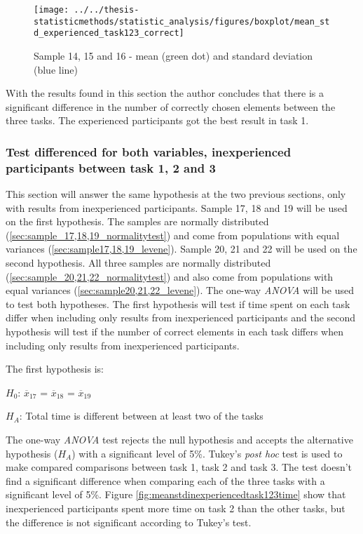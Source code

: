 \begin{figure}[H]
	\centering
	\texttt{[image: ../../thesis-statisticmethods/statistic\_analysis/figures/boxplot/mean\_std\_experienced\_task123\_correct]}
	\caption{Sample 14, 15 and 16 - mean (green dot) and standard deviation (blue line)}
	\label{fig:meanstdexperiencedtask123correct}
\end{figure}

\vspace{0.3cm}

With the results found in this section the author concludes that there is a significant difference in the number of correctly chosen elements between the three tasks. The experienced participants got the best result in task 1. 

\subsubsection[Sample 17, 18 and 19, 20, 21 and 22]{Test differenced for both variables, inexperienced participants between task 1, 2 and 3}\label{sec:sample_17_18_19_anova}

This section will answer the same hypothesis at the two previous sections, only with results from inexperienced participants. Sample 17, 18 and 19 will be used on the first hypothesis. The samples are normally distributed (\ref{sec:sample_17,18,19_normalitytest}) and come from populations with equal variances (\ref{sec:sample17,18,19_levene}). Sample 20, 21 and 22 will be used on the second hypothesis. All three samples are normally distributed (\ref{sec:sample_20,21,22_normalitytest}) and also come from populations with equal variances (\ref{sec:sample20,21,22_levene}). The one-way \textit{ANOVA} will be used to test both hypotheses. The first hypothesis will test if time spent on each task differ when including only results from inexperienced participants and the second hypothesis will test if the number of correct elements in each task differs when including only results from inexperienced participants. 

The first hypothesis is:\\
\centerline{$H_{0}$: $\overline{x}_{17}$ = $\overline{x}_{18}$ = $\overline{x}_{19}$}
\centerline{$H_{A}$: Total time is different between at least two of the tasks}

The one-way \textit{ANOVA} test rejects the null hypothesis and accepts the alternative hypothesis ($H_{A}$) with a significant level of 5\%. Tukey's \textit{post hoc} test is used to make compared comparisons between task 1, task 2 and task 3. The test doesn't find a significant difference when comparing each of the three tasks with a significant level of 5\%. Figure \ref{fig:meanstdinexperiencedtask123time} show that inexperienced participants spent more time on task 2 than the other tasks, but the difference is not significant according to Tukey's test.

